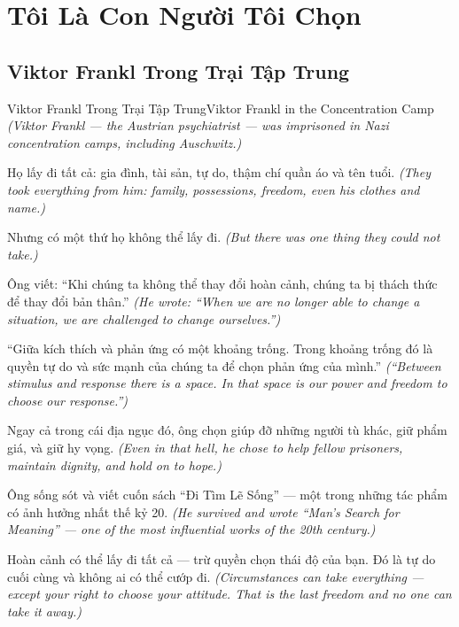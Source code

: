 \chapter{Tôi Là Con Người Tôi Chọn}

\section{Viktor Frankl Trong Trại Tập Trung}
\begin{truyen}{Viktor Frankl Trong Trại Tập Trung}{Viktor Frankl in the Concentration Camp}
\textit{(Viktor Frankl — the Austrian psychiatrist — was imprisoned in Nazi concentration camps, including Auschwitz.)}

Họ lấy đi tất cả: gia đình, tài sản, tự do, thậm chí quần áo và tên tuổi.
\textit{(They took everything from him: family, possessions, freedom, even his clothes and name.)}

Nhưng có một thứ họ không thể lấy đi.
\textit{(But there was one thing they could not take.)}

Ông viết: ``Khi chúng ta không thể thay đổi hoàn cảnh, chúng ta bị thách thức để thay đổi bản thân.''
\textit{(He wrote: ``When we are no longer able to change a situation, we are challenged to change ourselves.'')}

``Giữa kích thích và phản ứng có một khoảng trống. Trong khoảng trống đó là quyền tự do và sức mạnh của chúng ta để chọn phản ứng của mình.''
\textit{(``Between stimulus and response there is a space. In that space is our power and freedom to choose our response.'')}

Ngay cả trong cái địa ngục đó, ông chọn giúp đỡ những người tù khác, giữ phẩm giá, và giữ hy vọng.
\textit{(Even in that hell, he chose to help fellow prisoners, maintain dignity, and hold on to hope.)}

Ông sống sót và viết cuốn sách ``Đi Tìm Lẽ Sống'' — một trong những tác phẩm có ảnh hưởng nhất thế kỷ 20.
\textit{(He survived and wrote ``Man's Search for Meaning'' — one of the most influential works of the 20th century.)}

\end{truyen}

\begin{baihoc}
Hoàn cảnh có thể lấy đi tất cả — trừ quyền chọn thái độ của bạn. Đó là tự do cuối cùng và không ai có thể cướp đi.
\textit{(Circumstances can take everything — except your right to choose your attitude. That is the last freedom and no one can take it away.)}
\end{baihoc}
\ngancach

